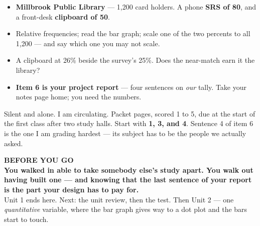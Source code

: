 \documentclass[aspectratio=169, 11pt]{beamer}
\begin{document}
\begin{frame}[t, plain]
  \begin{itemize}\setlength{\itemsep}{4pt}
    \item \textbf{Millbrook Public Library} --- 1{,}200 card holders. A phone \textbf{SRS of 80},
          and a front-desk \textbf{clipboard of 50}.
    \item Relative frequencies; read the bar graph; scale one of the two percents to all 1{,}200
          --- and say which one you may not scale.
    \item A clipboard at 26\% beside the survey's 25\%. Does the near-match earn it the library?
    \item \textbf{Item 6 is your project report} --- four sentences on \emph{our} tally. Take your
          notes page home; you need the numbers.
  \end{itemize}
  \begin{block}{Silent and alone. I am circulating. Packet pages, scored 1 to 5, due at the start of the first class after two study halls.}
    Start with \textbf{1, 3, and 4}. Sentence 4 of item 6 is the one I am grading hardest ---
    its subject has to be the people we actually asked.
  \end{block}
\end{frame}

{
\begin{frame}[plain]
  \vspace{1.5cm}\hspace{0.8cm}%
  \begin{minipage}{0.86\textwidth}
    {\color{goldacc}\bfseries\small BEFORE YOU GO}\\[0.7cm]
    {\color{white}\bfseries\Large You walked in able to take somebody else's study apart. You
    walk out having built one --- and knowing that the last sentence of your report is the part
    your design has to pay for.}\\[0.9cm]
    {\color{frostmid}\small Unit 1 ends here. Next: the unit review, then the test. Then Unit 2
    --- one \emph{quantitative} variable, where the bar graph gives way to a dot plot and the
    bars start to touch.}
  \end{minipage}
\end{frame}
}
\end{document}
